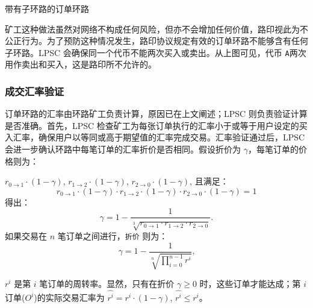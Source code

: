 \documentclass[UTF8,nofonts]{ctexart}%
\makeatletter
\newenvironment{figurehere}
 {\def\@captype{figure}}
 {}
\makeatother
\begin{document}
\begin{multicols}{2}
\begin{center}
\begin{figurehere}

\caption{带有子环路的订单环路}
\label{fig:subring}
\end{figurehere}
\end{center}

矿工这种做法虽然对网络不构成任何风险，但亦不会增加任何价值，路印视此为不公正行为。为了预防这种情况发生，路印协议规定有效的订单环路不能够含有任何子环路。LPSC 会确保同一个代币不能两次买入或卖出。从上图可见，代币 \verb|A|两次用作卖出和买入，这是路印所不允许的。


\subsubsection{成交汇率验证\label{sec:fill_rate_check}}


订单环路的汇率由环路矿工负责计算，原因已在上文阐述；LPSC 则负责验证计算是否准确。首先，LPSC 检查矿工为每张订单执行的汇率小于或等于用户设定的买入汇率，确保用户以等同或高于期望值的汇率完成交易。汇率验证通过后，LPSC 会进一步确认环路中每笔订单的汇率折价是否相同。假设折价为 $\gamma$，每笔订单的价格则为：

$r_{0\rightarrow 1} \cdot (1-\gamma)$, $r_{1\rightarrow 2} \cdot (1-\gamma)$, $r_{2 \rightarrow 0} \cdot (1-\gamma)$, 且满足：
\begin{equation}
r_{0\rightarrow 1} \cdot (1-\gamma)\cdot r_{1\rightarrow 2} \cdot (1-\gamma) \cdot r_{2 \rightarrow 0} \cdot (1-\gamma) = 1
\end{equation}
得出： 
\begin{equation}
\gamma = 1- \frac{1}{\sqrt[3]{r_{0\rightarrow 1} \cdot r_{1\rightarrow 2} \cdot r_{2\rightarrow 0}}}\text{.}
\end{equation}
如果交易在 $n$ 笔订单之间进行，\texttt{折价} 则为：
\begin{equation}
\gamma = 1- \frac{1}{\sqrt[n]{\prod_{i=0}^{n-1} r^i}} \text{,}
\end{equation}

 $r^i$ 是第 $i$ 笔订单的周转率。显然，只有在折价 $\gamma \ge 0$ 时，这些订单才能达成；第 $i$ 订单($O^i$)的实际交易汇率为 $\hat{r^i} = r^i \cdot (1-\gamma)$, $\hat{r^i}\le r^i$。


\end{multicols}
\end{document}
